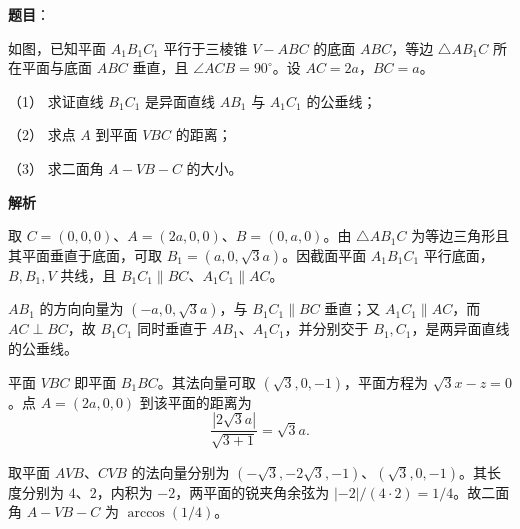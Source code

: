 \begin{answer}

\textbf{题目}：

如图，已知平面 $A_1B_1C_1$ 平行于三棱锥 $V-ABC$ 的底面 $ABC$，等边 $\triangle AB_1C$ 所在平面与底面 $ABC$ 垂直，且 $\angle ACB=90^\circ$。设 $AC=2a$，$BC=a$。

（1） 求证直线 $B_1C_1$ 是异面直线 $AB_1$ 与 $A_1C_1$ 的公垂线；

（2） 求点 $A$ 到平面 $VBC$ 的距离；

（3） 求二面角 $A-VB-C$ 的大小。
\nopagebreak[4]
\begin{center}\end{center}
\nopagebreak[4]
\textbf{解析}

取 $C=(0,0,0)$、$A=(2a,0,0)$、$B=(0,a,0)$。由 $\triangle AB_1C$ 为等边三角形且其平面垂直于底面，可取 $B_1=(a,0,\sqrt3a)$。因截面平面 $A_1B_1C_1$ 平行底面，$B,B_1,V$ 共线，且 $B_1C_1\parallel BC$、$A_1C_1\parallel AC$。


$AB_1$ 的方向向量为 $(-a,0,\sqrt3a)$，与 $B_1C_1\parallel BC$ 垂直；又 $A_1C_1\parallel AC$，而 $AC\perp BC$，故 $B_1C_1$ 同时垂直于 $AB_1$、$A_1C_1$，并分别交于 $B_1,C_1$，是两异面直线的公垂线。


平面 $VBC$ 即平面 $B_1BC$。其法向量可取 $(\sqrt3,0,-1)$，平面方程为 $\sqrt3x-z=0$。点 $A=(2a,0,0)$ 到该平面的距离为
\nopagebreak[4]
\[
\frac{|2\sqrt3a|}{\sqrt{3+1}}=\sqrt3a.
\]


取平面 $AVB$、$CVB$ 的法向量分别为 $(-\sqrt3,-2\sqrt3,-1)$、$(\sqrt3,0,-1)$。其长度分别为 $4$、$2$，内积为 $-2$，两平面的锐夹角余弦为 $|{-2}|/(4\cdot2)=1/4$。故二面角 $A-VB-C$ 为 $\arccos(1/4)$。




\end{answer}
